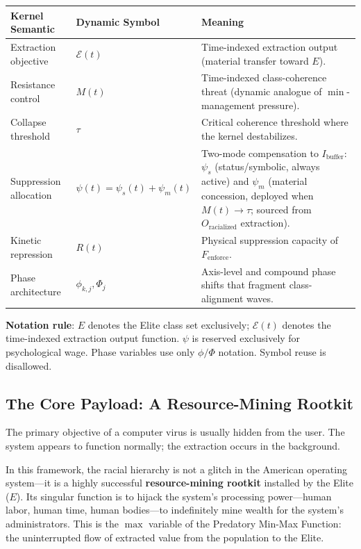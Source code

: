 \documentclass[12pt,openany]{book}
\begin{document}
\begin{center}
\renewcommand{\arraystretch}{1.35}
\begin{tabular}{>{\raggedright}p{3.3cm} >{\raggedright}p{3.4cm} >{\raggedright\arraybackslash}p{7.4cm}}
\toprule
\textbf{Kernel Semantic} & \textbf{Dynamic Symbol} & \textbf{Meaning} \\
\midrule
Extraction objective & $\mathcal{E}(t)$ & Time-indexed extraction output (material transfer toward $E$). \\
Resistance control & $M(t)$ & Time-indexed class-coherence threat (dynamic analogue of $\min$-management pressure). \\
Collapse threshold & $\tau$ & Critical coherence threshold where the kernel destabilizes. \\
Suppression allocation & $\psi(t) = \psi_s(t) + \psi_m(t)$ & Two-mode compensation to $I_{\text{buffer}}$: $\psi_s$ (status/symbolic, always active) and $\psi_m$ (material concession, deployed when $M(t) \to \tau$; sourced from $O_{\text{racialized}}$ extraction). \\
Kinetic repression & $R(t)$ & Physical suppression capacity of $F_{\text{enforce}}$. \\
Phase architecture & $\phi_{k,j}, \Phi_j$ & Axis-level and compound phase shifts that fragment class-alignment waves. \\
\bottomrule
\end{tabular}
\end{center}

\textbf{Notation rule}: $E$ denotes the Elite class set exclusively; $\mathcal{E}(t)$ denotes the time-indexed extraction output function. $\psi$ is reserved exclusively for psychological wage. Phase variables use only $\phi/\Phi$ notation. Symbol reuse is disallowed.

\subsection{The Core Payload: A Resource-Mining Rootkit}

The primary objective of a computer virus is usually hidden from the user. The system appears to function normally; the extraction occurs in the background.

In this framework, the racial hierarchy is not a glitch in the American operating system---it is a highly successful \textbf{resource-mining rootkit} installed by the Elite ($E$). Its singular function is to hijack the system's processing power---human labor, human time, human bodies---to indefinitely mine wealth for the system's administrators. This is the $\max$ variable of the Predatory Min-Max Function: the uninterrupted flow of extracted value from the population to the Elite.
\end{document}

